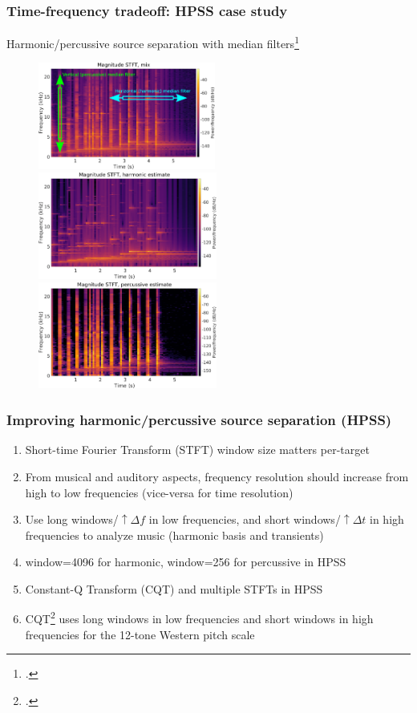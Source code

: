 \documentclass[usenames,dvipsnames]{beamer}
\begin{document}
\begin{frame}
	\frametitle{Time-frequency tradeoff: HPSS case study}
	Harmonic/percussive source separation with median filters\footcite{fitzgerald1}
	\begin{figure}
		\centering
		\includegraphics[height=3.5cm]{./images-mila-presentation/mix_stft_medianfilters.png}\\
		\includegraphics[height=3.5cm]{./images-mila-presentation/harm_stft.png}
		\includegraphics[height=3.5cm]{./images-mila-presentation/perc_stft.png}
	\end{figure}
\end{frame}

\begin{frame}
	\frametitle{Improving harmonic/percussive source separation (HPSS)}
	\begin{enumerate}
	\item
		Short-time Fourier Transform (STFT) window size matters per-target
	\item
		From musical and auditory aspects, frequency resolution should increase from high to low frequencies (vice-versa for time resolution)
	\item
		Use long windows/$\uparrow \Delta f$ in low frequencies, and short windows/$\uparrow \Delta t$ in high frequencies to analyze music (harmonic basis and transients)
	\item
		window=4096 for harmonic, window=256 for percussive in HPSS
	\item
		Constant-Q Transform (CQT) and multiple STFTs in HPSS
	\item
		CQT\footcite{jbrown, klapuricqt} uses long windows in low frequencies and short windows in high frequencies for the 12-tone Western pitch scale
	\end{enumerate}
\end{frame}
\end{document}
